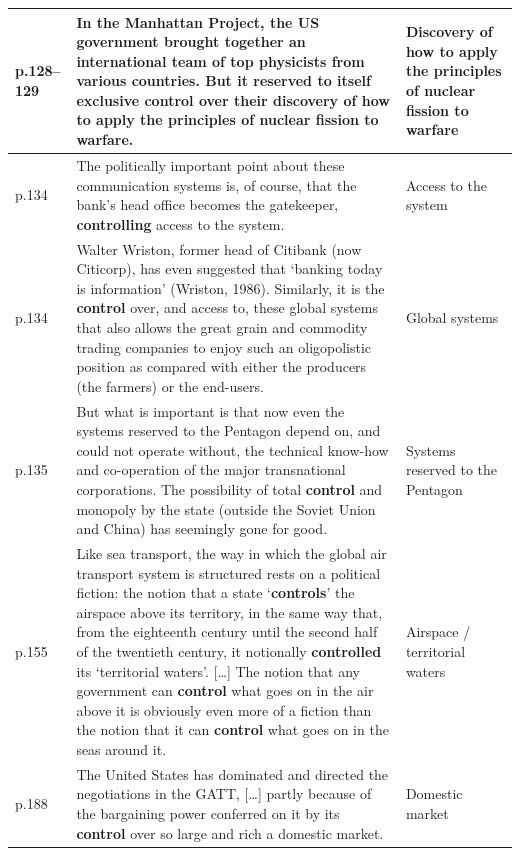 \begin{longtable}{p{1.2cm} p{9.5cm} p{3.2cm}}
p.128--129 & In the Manhattan Project, the US government brought together an international team of top physicists from various countries. But it reserved to itself exclusive \textbf{control} over their discovery of how to apply the principles of nuclear fission to warfare. & Discovery of how to apply the principles of nuclear fission to warfare \\
\midrule

p.134 & The politically important point about these communication systems is, of course, that the bank's head office becomes the gatekeeper, \textbf{controlling} access to the system. & Access to the system \\
\midrule

p.134 & Walter Wriston, former head of Citibank (now Citicorp), has even suggested that `banking today is information' (Wriston, 1986). Similarly, it is the \textbf{control} over, and access to, these global systems that also allows the great grain and commodity trading companies to enjoy such an oligopolistic position as compared with either the producers (the farmers) or the end-users. & Global systems \\
\midrule

p.135 & But what is important is that now even the systems reserved to the Pentagon depend on, and could not operate without, the technical know-how and co-operation of the major transnational corporations. The possibility of total \textbf{control} and monopoly by the state (outside the Soviet Union and China) has seemingly gone for good. & Systems reserved to the Pentagon \\
\midrule

p.155 & Like sea transport, the way in which the global air transport system is structured rests on a political fiction: the notion that a state `\textbf{controls}' the airspace above its territory, in the same way that, from the eighteenth century until the second half of the twentieth century, it notionally \textbf{controlled} its `territorial waters'. {[}\ldots{]} The notion that any government can \textbf{control} what goes on in the air above it is obviously even more of a fiction than the notion that it can \textbf{control} what goes on in the seas around it. & Airspace / territorial waters \\
\midrule

p.188 & The United States has dominated and directed the negotiations in the GATT, {[}\ldots{]} partly because of the bargaining power conferred on it by its \textbf{control} over so large and rich a domestic market. & Domestic market \\
\midrule


\end{longtable}
